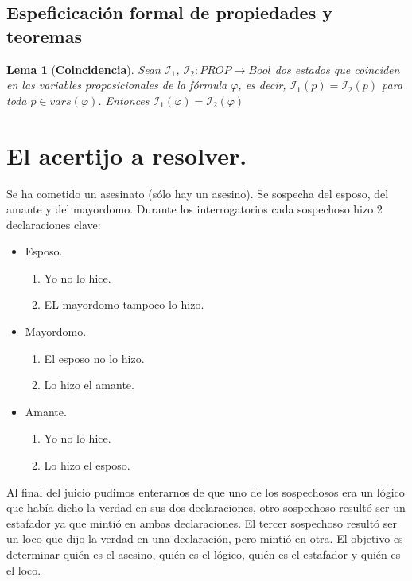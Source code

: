 \documentclass[letterpaper,11pt]{article}
\begin{document}
    \subsection{Espeficicación formal de propiedades y teoremas}
    \newtheorem{theorem}{Lema}
    \begin{theorem} [\textbf{Coincidencia}]
        Sean $\mathcal{I}_{1}$, $\mathcal{I}_{2} : PROP \rightarrow Bool$ dos
        estados que coinciden en las variables proposicionales de la fórmula 
        $\varphi$, es decir, $\mathcal{I}_{1}(p) = \mathcal{I}_{2}(p)$ para 
        toda $p \in vars(\varphi)$. Entonces 
        $\mathcal{I}_{1}(\varphi) = \mathcal{I}_{2}(\varphi)$
    \end{theorem}

    \section{El acertijo a resolver.}
    Se ha cometido un asesinato (sólo hay un asesino). Se sospecha del esposo,
    del amante y del mayordomo. Durante los interrogatorios cada sospechoso 
    hizo 2 declaraciones clave:
    \begin{itemize}
        \item Esposo.
        \begin{enumerate}
            \item Yo no lo hice.
            \item EL mayordomo tampoco lo hizo.
        \end{enumerate}
        \item Mayordomo.
        \begin{enumerate}
            \item El esposo no lo hizo.
            \item Lo hizo el amante.
        \end{enumerate}
        \item Amante.
        \begin{enumerate}
            \item Yo no lo hice.
            \item Lo hizo el esposo.
        \end{enumerate}
    \end{itemize}

    Al final del juicio pudimos enterarnos de que uno de los sospechosos era un
    lógico que había dicho la verdad en sus dos declaraciones, otro sospechoso
    resultó ser un estafador ya que mintió en ambas declaraciones. El tercer 
    sospechoso resultó ser un loco que dijo la verdad en una declaración, pero 
    mintió en otra.
    El objetivo es determinar quién es el asesino, quién es el lógico, quién es
    el estafador y quién es el loco.
\end{document}

